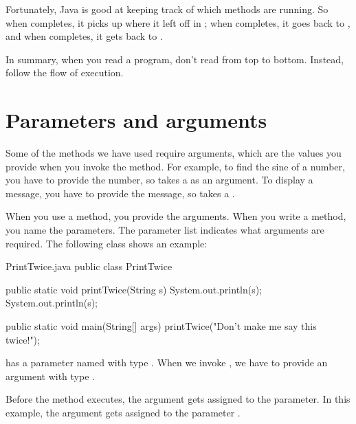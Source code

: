 Fortunately, Java is good at keeping track of which methods are running.
So when  completes, it picks up where it left off in ; when  completes, it goes back to , and when  completes, it gets back to .

In summary, when you read a program, don't read from top to bottom.
Instead, follow the flow of execution.



\section{Parameters and arguments}


Some of the methods we have used require arguments, which are the values you provide when you invoke the method.
For example, to find the sine of a number, you have to provide the number, so  takes a  as an argument.
To display a message, you have to provide the message, so  takes a .

When you use a method, you provide the arguments.
When you write a method, you name the parameters.
The parameter list indicates what arguments are required.
The following class shows an example:

\begin{trinket}[295]{PrintTwice.java}
public class PrintTwice {

    public static void printTwice(String s) {
        System.out.println(s);
        System.out.println(s);
    }

    public static void main(String[] args) {
        printTwice("Don't make me say this twice!");
    }
}
\end{trinket}

 has a parameter named  with type .
When we invoke , we have to provide an argument with type .

Before the method executes, the argument gets assigned to the parameter.
In this example, the argument  gets assigned to the parameter .

